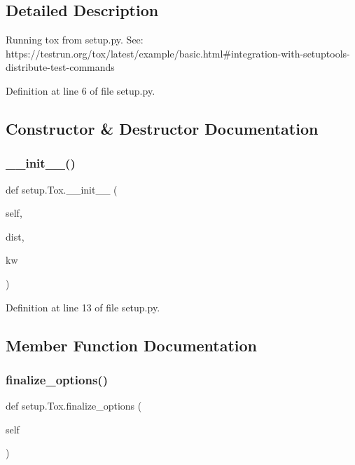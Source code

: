 \subsection{Detailed Description}
\begin{DoxyVerb}Running tox from setup.py.
See:
https://testrun.org/tox/latest/example/basic.html#integration-with-setuptools-distribute-test-commands
\end{DoxyVerb}
 

Definition at line 6 of file setup.\+py.



\subsection{Constructor \& Destructor Documentation}
\hypertarget{classsetup_1_1_tox_a159692462d94cd3b4baae75e26971c73}{}\label{classsetup_1_1_tox_a159692462d94cd3b4baae75e26971c73} 
\subsubsection{\texorpdfstring{\+\_\+\+\_\+init\+\_\+\+\_\+()}{\_\_init\_\_()}}
{\footnotesize\ttfamily def setup.\+Tox.\+\_\+\+\_\+init\+\_\+\+\_\+ (\begin{DoxyParamCaption}\item[{}]{self,  }\item[{}]{dist,  }\item[{}]{kw }\end{DoxyParamCaption})}



Definition at line 13 of file setup.\+py.



\subsection{Member Function Documentation}
\hypertarget{classsetup_1_1_tox_a1cbe599935826256c44168aa052f7f33}{}\label{classsetup_1_1_tox_a1cbe599935826256c44168aa052f7f33} 
\subsubsection{\texorpdfstring{finalize\+\_\+options()}{finalize\_options()}}
{\footnotesize\ttfamily def setup.\+Tox.\+finalize\+\_\+options (\begin{DoxyParamCaption}\item[{}]{self }\end{DoxyParamCaption})}




